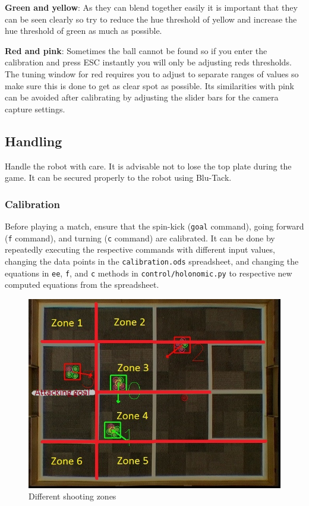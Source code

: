 \documentclass[a4paper,12pt]{article}
\begin{document}
\textbf{Green and yellow}: As they can blend together easily it is important that they can be seen clearly so try to reduce the hue threshold of yellow and increase the hue threshold of green as much as possible. 

\textbf{Red and pink}: Sometimes the ball cannot be found so if you enter the calibration and press ESC instantly you will only be adjusting reds thresholds. The tuning window for red requires you to adjust to separate ranges of values so make sure this is done to get as clear spot as possible.  Its similarities with pink can be avoided after calibrating by adjusting the slider bars for the camera capture settings.      

\subsection{Handling} \label{handling}

Handle the robot with care. It is advisable not to lose the top plate during the game. It can be secured properly to the robot using Blu-Tack. 

\subsubsection{Calibration}

Before playing a match, ensure that the spin-kick (\texttt{goal} command), going forward (\texttt{f} command), and turning (\texttt{c} command) are calibrated. It can be done by repeatedly executing the respective commands with different input values, changing the data points in the \texttt{calibration.ods} spreadsheet, and changing the equations in \texttt{ee}, \texttt{f}, and \texttt{c} methods in \texttt{control/holonomic.py} to respective new computed equations from the spreadsheet. 

\begin{figure}
\centering
\includegraphics[scale=.4]{zones.jpg}
\caption{Different shooting zones}
\label{fig:zones}
\end{figure}
\end{document}
